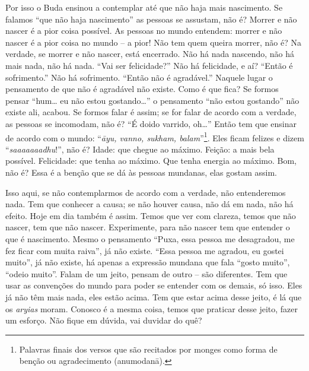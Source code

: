 Por isso o Buda ensinou a contemplar até que não haja mais
nascimento. Se falamos “que não haja nascimento” as pessoas se
assustam, não é? Morrer e não nascer é a pior coisa possível. As
pessoas no mundo entendem: morrer e não nascer é a pior coisa no mundo
– a pior! Não tem quem queira morrer, não é? Na verdade, se morrer e
não nascer, está encerrado. Não há nada nascendo, não há mais nada, não
há nada. “Vai ser felicidade?” Não há felicidade, e aí? “Então é
sofrimento.” Não há sofrimento. “Então não é agradável.” Naquele lugar
o pensamento de que não é agradável não existe. Como é que fica? Se
formos pensar “hum… eu não estou gostando…” o pensamento “não estou
gostando” não existe ali, acabou. Se formos falar é assim; se for falar
de acordo com a verdade, as pessoas se incomodam, não é? “É doido
varrido, oh…” Então tem que ensinar de acordo com o mundo:
“\textit{\=ayu, vanno, sukham, balam}”\footnote{Palavras finais dos
versos que são recitados por monges como forma de benção ou
agradecimento (anumodan\=a).}. Eles ficam felizes e dizem
“\textit{saaaaaaadhu}!”, não é? Idade: que chegue ao máximo. Feição: a
mais bela possível. Felicidade: que tenha ao máximo. Que tenha energia
ao máximo. Bom, não é? Essa é a benção que se dá às pessoas mundanas,
elas gostam assim. 

Isso aqui, se não contemplarmos de acordo com a verdade, não
entenderemos nada. Tem que conhecer a causa; se não houver causa, não
dá em nada, não há efeito. Hoje em dia também é assim. Temos que ver
com clareza, temos que não nascer, tem que não nascer. Experimente,
para não nascer tem que entender o que é nascimento. Mesmo o pensamento
“Puxa, essa pessoa me desagradou, me fez ficar com muita raiva”, já não
existe. “Essa pessoa me agradou, eu gostei muito”, já não existe, há
apenas a expressão mundana que fala “gosto muito”, “odeio muito”. Falam
de um jeito, pensam de outro – são diferentes. Tem que usar as
convenções do mundo para poder se entender com os demais, só isso. Eles
já não têm mais nada, eles estão acima. Tem que estar acima desse
jeito, é lá que os \textit{aryias} moram. Conosco é a mesma coisa,
temos que praticar desse jeito, fazer um esforço. Não fique em dúvida,
vai duvidar do quê? 

